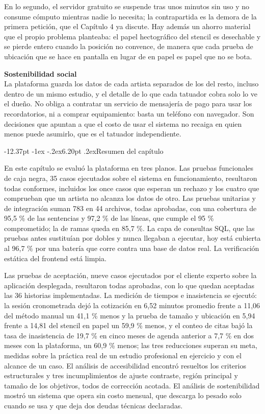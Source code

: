 \documentclass[12pt,letterpaper,oneside]{report}
\makeatletter
\renewcommand\section{\@startsection{section}{1}{\z@}%
  {-12.37pt \@plus -1ex \@minus -.2ex}{6.20pt \@plus.2ex}{\normalfont\large\bfseries}}
\newcommand{\tituloparpegado}[1]{\par\textbf{#1}\\\indent\ignorespaces}
\makeatother
\begin{document}
En lo segundo, el servidor gratuito se suspende tras unos minutos sin uso y no consume cómputo mientras nadie lo necesita; la contrapartida es la demora de la primera petición, que el Capítulo 4 ya discute. Hay además un ahorro material que el propio problema planteaba: el papel hectográfico del stencil es desechable y se pierde entero cuando la posición no convence, de manera que cada prueba de ubicación que se hace en pantalla en lugar de en papel es papel que no se bota.

\vspace{\parskip}
\tituloparpegado{Sostenibilidad social}
La plataforma guarda los datos de cada artista separados de los del resto, incluso dentro de un mismo estudio, y el detalle de lo que cada tatuador cobra solo lo ve el dueño. No obliga a contratar un servicio de mensajería de pago para usar los recordatorios, ni a comprar equipamiento: basta un teléfono con navegador. Son decisiones que apuntan a que el costo de usar el sistema no recaiga en quien menos puede asumirlo, que es el tatuador independiente.

\section{Resumen del capítulo}

En este capítulo se evaluó la plataforma en tres planos. Las pruebas funcionales de caja negra, 35 casos ejecutados sobre el sistema en funcionamiento, resultaron todas conformes, incluidos los once casos que esperan un rechazo y los cuatro que comprueban que un artista no alcanza los datos de otro. Las pruebas unitarias y de integración suman 783 en 44 archivos, todas aprobadas, con una cobertura de 95,5 \% de las sentencias y 97,2 \% de las líneas, que cumple el 95 \% comprometido; la de ramas queda en 85,7 \%. La capa de consultas SQL, que las pruebas antes sustituían por dobles y nunca llegaban a ejecutar, hoy está cubierta al 96,7 \% por una batería que corre contra una base de datos real. La verificación estática del frontend está limpia.

Las pruebas de aceptación, nueve casos ejecutados por el cliente experto sobre la aplicación desplegada, resultaron todas aprobadas, con lo que quedan aceptadas las 36 historias implementadas. La medición de tiempos e inasistencia se ejecutó: la sesión cronometrada dejó la cotización en 6,52 minutos promedio frente a 11,06 del método manual un 41,1 \% menos y la prueba de tamaño y ubicación en 5,94 frente a 14,81 del stencil en papel un 59,9 \% menos, y el conteo de citas bajó la tasa de inasistencia de 19,7 \% en cinco meses de agenda anterior a 7,7 \% en dos meses con la plataforma, un 60,9 \% menos; las tres reducciones superan su meta, medidas sobre la práctica real de un estudio profesional en ejercicio y con el alcance de un caso. El análisis de accesibilidad encontró resueltos los criterios estructurales y tres incumplimientos de ajuste contraste, región principal y tamaño de los objetivos, todos de corrección acotada. El análisis de sostenibilidad mostró un sistema que opera sin costo mensual, que descarga lo pesado solo cuando se usa y que deja dos deudas técnicas declaradas.
\end{document}
